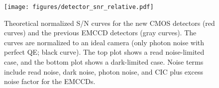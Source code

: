 \begin{figure}
    \centering
    \texttt{[image: figures/detector\_snr\_relative.pdf]}
    \caption{Theoretical normalized S/N curves for the new CMOS detectors (red curves) and the previous EMCCD detectors (gray curves). The curves are normalized to an ideal camera (only photon noise with perfect QE; black curve). The top plot shows a read noise-limited case, and the bottom plot shows a dark-limited case. Noise terms include read noise, dark noise, photon noise, and CIC plus excess noise factor for the EMCCDs.\label{fig:detector_snr_relative}}
\end{figure}


